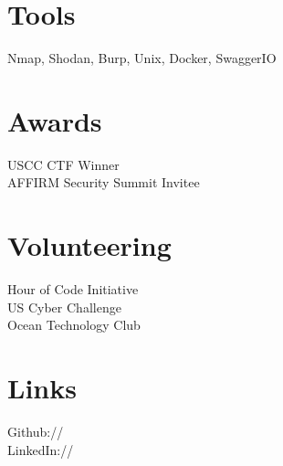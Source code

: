 \documentclass[]{deedy-resume-openfont}
\begin{document}
\begin{minipage}[t]{0.25\textwidth}
\sectionsep
\section{Tools}
Nmap, Shodan, Burp, Unix, Docker, SwaggerIO
\sectionsep


\section{Awards}
USCC CTF Winner\\
AFFIRM Security Summit Invitee\\
\sectionsep


\section{Volunteering}
Hour of Code Initiative \\
US Cyber Challenge \\
Ocean Technology Club\\
\sectionsep


\section{Links}
Github:// \href{https://github.com/btcrs}{} \\
LinkedIn://  \href{https://www.linkedin.com/in/btcrs}{} \\
\sectionsep


%
%

\end{minipage} 
\hfill
\end{document}
